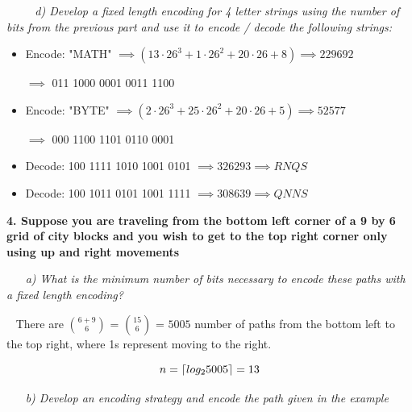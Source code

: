 \documentclass[12pt, letterpaper]{article}
\DeclarePairedDelimiter{\ceil}{\lceil}{\rceil}
\begin{document}
\-\ \newline
\-\ \newline
\-\ \it{ d) Develop a fixed length encoding for 4 letter strings using the number of bits from the previous part and use it to encode / decode the following strings: }
\begin{itemize} 
\item Encode: "MATH"
\( \implies (13 \cdot 26^3 + 1 \cdot 26^2 + 20 \cdot 26 + 8) \implies 229692 \)

\( \implies \) 011 1000 0001 0011 1100 \newline


\item Encode: "BYTE"
\( \implies (2\cdot26^3 + 25\cdot 26^2 + 20\cdot 26 + 5) \implies 52577\)

\( \implies \) 000 1100 1101 0110 0001 \newline

\item Decode: 100 1111 1010 1001 0101
\( \implies 326293 \implies RNQS \)

\item Decode: 100 1011 0101 1001 1111
\( \implies 308639 \implies QNNS \)

\end{itemize}


\newpage
\bf{ 4. Suppose you are traveling from the bottom left corner of a 9 by 6 grid of city blocks and you wish to get to the top right corner only using up and right movements }

\-\ \newline
\-\ \it{ a) What is the minimum number of bits necessary to encode these paths with a fixed length encoding? }

\-\ \newline
\textnormal{There are \(6 + 9 \choose 6\) = \(15 \choose 6\) = \( 5005 \) number of paths from the bottom left to the top right, where 1s represent moving to the right.  }

\[ n = \ceil{ log_2{5005} } = 13 \]


\-\ \newline
\-\ \it{ b) Develop an encoding strategy and encode the path given in the example }
\end{document}
